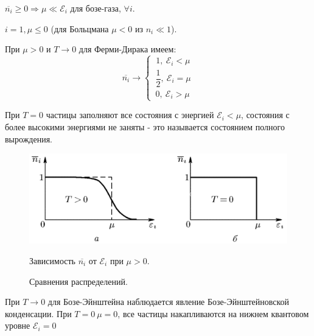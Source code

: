 \documentclass[a4paper, 12pt, openany]{book}
\begin{document}
	\tab $\overline{n_i} \geq 0 \Rightarrow \mu \ll \mathcal{E}_i$ для бозе-газа, $\forall i$.
	
	\tab $i = 1, \mu \leq 0 $ (для Больцмана $\mu < 0$ из $n_i \ll 1$).
	
	\tab При $\mu > 0$ и $T \rightarrow 0$ для Ферми-Дирака имеем:
	$$
	\overline{n_i} \rightarrow \left\{
		\begin{array}{l}\
			1, ~\mathcal{E}_i < \mu \\
			\,\dfrac{1}{2}, ~\mathcal{E}_i = \mu \\
			\,0, ~\mathcal{E}_i > \mu
		\end{array}
		 \right.
	$$
	
	\tab При $T = 0$ частицы заполняют все состояния с энергией $\mathcal{E}_i < \mu$, состояния с более высокими энергиями не заняты - это называется состоянием полного вырождения.
	
		\begin{figure}[h]
			{\includegraphics[width=0.85\linewidth]{graph1}}
			\caption{
				Зависимость $\overline{n_i}$ от $\mathcal{E}_i$ при $\mu > 0$.
			}
			\label{pic2}
		\end{figure}
		
			\begin{figure}[h]
				\caption{
					Сравнения распределений.
				}
				\label{pic3}
			\end{figure}
	
	\newpage \tab При $T \rightarrow 0$ для Бозе-Эйнштейна наблюдается явление Бозе-Эйнштейновской конденсации. При $T = 0 ~ \mu = 0$, все частицы накапливаются на нижнем квантовом уровне $\mathcal{E}_i = 0$
	
\end{document}

